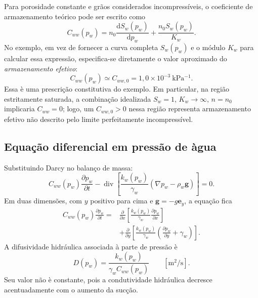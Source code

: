 \documentclass[11pt,a4paper]{article}
\numberwithin{equation}{section}
\newcommand{\Div}{\operatorname{div}}
\newcommand{\dd}{\mathrm{d}}
\begin{document}
Para porosidade constante e gr\~aos considerados incompress\'iveis,
o coeficiente de armazenamento te\'orico pode ser escrito como
\begin{equation}
\boxed{C_{ww}(p_w)=
n_0\frac{\dd S_w(p_w)}{\dd p_w}
+\frac{n_0S_w(p_w)}{K_w}.}
\end{equation}
No exemplo, em vez de fornecer a curva completa $S_w(p_w)$ e o m\'odulo
$K_w$ para calcular essa express\~ao, especifica-se diretamente
o valor aproximado do \emph{armazenamento efetivo}:
\begin{equation}
\boxed{C_{ww}(p_w)\simeq C_{ww,0}
=1{,}0\times10^{-3}\ \mathrm{kPa^{-1}}.}
\end{equation}
Essa \`e uma prescri\c{c}\~ao constitutiva do exemplo. Em particular,
na regi\~ao estritamente saturada, a combina\c{c}\~ao idealizada
$S_w=1$, $K_w\to\infty$, $n=n_0$ implicaria $C_{ww}=0$;
logo, um $C_{ww,0}>0$ nessa regi\~ao representa armazenamento
efetivo n\~ao descrito pelo limite perfeitamente incompress\'ivel.

\subsection{Equa\c{c}\~ao diferencial em press\~ao de \`agua}

Substituindo Darcy no balan\c{c}o de massa:
\begin{equation}
\boxed{C_{ww}(p_w)\frac{\partial p_w}{\partial t}
-\Div\left[\frac{k_w(p_w)}{\gamma_w}
\left(\nabla p_w-\rho_w\mathbf g\right)\right]=0.}
\end{equation}
Em duas dimens\~oes, com $y$ positivo para cima e
$\mathbf g=-g\mathbf e_y$, a equa\c{c}\~ao fica
\begin{equation}
\boxed{\begin{aligned}
C_{ww}(p_w)\frac{\partial p_w}{\partial t}
={}&\frac{\partial}{\partial x}\left[
\frac{k_w(p_w)}{\gamma_w}\frac{\partial p_w}{\partial x}\right]\\
&+\frac{\partial}{\partial y}\left[
\frac{k_w(p_w)}{\gamma_w}
\left(\frac{\partial p_w}{\partial y}+\gamma_w\right)\right].
\end{aligned}}
\end{equation}
A difusividade hidr\'aulica associada \`a parte de press\~ao \`e
\begin{equation}
\boxed{D(p_w)=\frac{k_w(p_w)}{\gamma_w C_{ww}(p_w)}
\qquad[\mathrm{m^2/s}].}
\end{equation}
Seu valor n\~ao \`e constante, pois a condutividade hidr\'aulica
decresce acentuadamente com o aumento da suc\c{c}\~ao.
\end{document}
